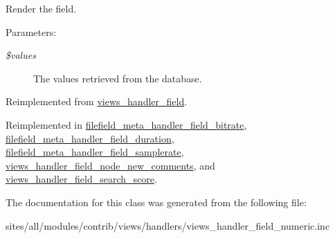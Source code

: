 Render the field.

\begin{Desc}
\item[Parameters:]
\begin{description}
\item[{\em \$values}]The values retrieved from the database. \end{description}
\end{Desc}


Reimplemented from \hyperlink{classviews__handler__field_82ff951c5e9ceb97b2eab86f880cbc1e}{views\_\-handler\_\-field}.

Reimplemented in \hyperlink{classfilefield__meta__handler__field__bitrate_8b49b6ccdf60cd91f344b3d781cdd51c}{filefield\_\-meta\_\-handler\_\-field\_\-bitrate}, \hyperlink{classfilefield__meta__handler__field__duration_f511f413dd52df372f7dc396efcc08f2}{filefield\_\-meta\_\-handler\_\-field\_\-duration}, \hyperlink{classfilefield__meta__handler__field__samplerate_8dd9fcfcf352e9699f02deed43a60e2c}{filefield\_\-meta\_\-handler\_\-field\_\-samplerate}, \hyperlink{classviews__handler__field__node__new__comments_6b1e79531ba28eb32e71c7ff2129e82d}{views\_\-handler\_\-field\_\-node\_\-new\_\-comments}, and \hyperlink{classviews__handler__field__search__score_80a58d69b8a6c7f57da022e88f90e32d}{views\_\-handler\_\-field\_\-search\_\-score}.

The documentation for this class was generated from the following file:\begin{CompactItemize}
\item 
sites/all/modules/contrib/views/handlers/views\_\-handler\_\-field\_\-numeric.inc\end{CompactItemize}
